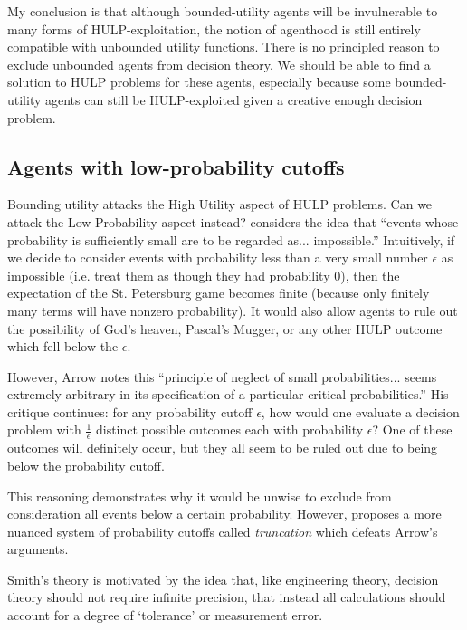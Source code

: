 \documentclass{article}
\begin{document}
My conclusion is that although bounded-utility agents will be invulnerable to many forms of HULP-exploitation, the notion of agenthood is still entirely compatible with unbounded utility functions. There is no principled reason to exclude unbounded agents from decision theory. We should be able to find a solution to HULP problems for these agents, especially because some bounded-utility agents can still be HULP-exploited given a creative enough decision problem.

\subsection{Agents with low-probability cutoffs}

Bounding utility attacks the High Utility aspect of HULP problems. Can we attack the Low Probability aspect instead? \citep{arrow1951alternative} considers the idea that ``events whose probability is sufficiently small are to be regarded as... impossible.'' Intuitively, if we decide to consider events with probability less than a very small number \(\epsilon\) as impossible (i.e. treat them as though they had probability 0), then the expectation of the St. Petersburg game becomes finite (because only finitely many terms will have nonzero probability). It would also allow agents to rule out the possibility of God's heaven, Pascal's Mugger, or any other HULP outcome which fell below the \(\epsilon\).

However, Arrow notes this ``principle of neglect of small probabilities... seems extremely arbitrary in its specification of a particular critical probabilities.'' His critique continues: for any probability cutoff \(\epsilon\), how would one evaluate a decision problem with \(\frac{1}{\epsilon}\) distinct possible outcomes each with probability \(\epsilon\)? One of these outcomes will definitely occur, but they all seem to be ruled out due to being below the probability cutoff.

This reasoning demonstrates why it would be unwise to exclude from consideration all events below a certain probability. However, \citep{smith2014evaluative} proposes a more nuanced system of probability cutoffs called \textit{truncation} which defeats Arrow's arguments.

Smith's theory is motivated by the idea that, like engineering theory, decision theory should not require infinite precision, that instead all calculations should account for a degree of `tolerance' or measurement error. 
\end{document}
